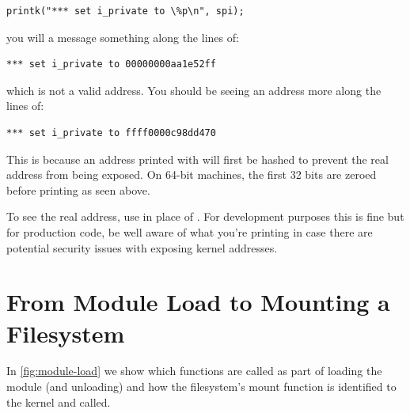 \begin{lstlisting}
printk("*** set i_private to \%p\n", spi);
\end{lstlisting}

\noindent
you will a message something along the lines of:

\begin{lstlisting}
*** set i_private to 00000000aa1e52ff
\end{lstlisting}

\noindent
which is not a valid address. You should be seeing an address more along the lines of:

\begin{lstlisting}
*** set i_private to ffff0000c98dd470
\end{lstlisting}

\noindent
This is because an address printed with  will first be hashed to prevent the real address from being exposed. On 64-bit machines, the first 32 bits are zeroed before printing as seen above.

To see the real address, use  in place of . For development purposes this is fine but for production code, be well aware of what you're printing in case there are potential security issues with exposing kernel addresses.


\section{From Module Load to Mounting a Filesystem}

In \ref{fig:module-load} we show which functions are called as part of loading the module (and unloading) and how the filesystem’s mount function is identified to the kernel and called.

